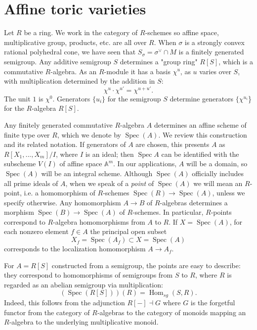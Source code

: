\documentclass[10pt,a4paper]{book}
\newcommand{\on}{\operatorname}
\DeclareMathOperator{\Spec}{Spec}
\begin{document}
\section{Affine toric varieties}
Let $R$ be a ring. We work in the category of $R$-schemes so affine space, multiplicative group, products, etc.  are all over $R$.
When $\sigma$ is a strongly convex rational polyhedral cone, we have seen that $S_\sigma = \sigma^\vee \cap M$ is a finitely generated semigroup. Any additive semigroup $S$ determines a "group ring" $R[S]$, which is a commutative $R$-algebra. As an $R$-module it has a basis $\chi^u$, as $u$ varies over $S$, with multiplication determined by the addition in $S$:
\[
\chi^u\cdot \chi^{u'} = \chi^{u+u'}.
\]
The unit $1$ is $\chi^0$. Generators $\{u_i\}$ for the semigroup $S$ determine generators $\{\chi^{u_i}$\} for the $R$-algebra $R[S]$. 

Any finitely generated commutative $R$-algebra $A$ determines an affine scheme of finite type over $R$, which we denote by $\Spec (A)$. We review this construction and its related notation. If generators of $A$ are chosen, this presents $A$ as $R[X_1,...,X_m]/I$, where $I$ is an ideal;
then $\Spec A$ can be identified with the subscheme $V(I)$ of affine space $\mathbb{A}^m$. In our applications, $A$ will be a domain, so $\Spec(A)$ will be an integral scheme. Although $\Spec(A)$ officially includes all prime ideals of $A$, when we speak of a \textit{point} of $\Spec(A)$ we will mean an $R$-point, i.e. a homomorphism of $R$-schemes $\Spec(R) \to \Spec(A)$, unless we specify otherwise. Any homomorphism $A \to B$ of $R$-algebras determines a morphism $\Spec(B)\to \Spec(A)$ of
$R$-schemes. In particular, $R$-points correspond to $R$-algebra homomorphisms from $A$ to $R$. If $X = \Spec(A)$, for each nonzero element $f \in A$ the principal open subset
\[
X_f = \Spec(A_f) \subset X = \Spec(A)
\]
corresponds to the localization homomorphism $A\to A_f$. 

For $A = R[S]$ constructed from a semigroup, the points are easy to describe: they correspond to homomorphisms of semigroups from $S$ to $R$, where $R$ is regarded as an abelian semigroup via
multiplication:
\[
(\Spec(R[S]))(R) = \on{Hom}_{sg}(S, R).
\]
Indeed, this follows from the adjunction $R[-] \dashv G$ where $G$ is the forgetful functor from the category of $R$-algebras to the category of monoids mapping an $R$-algebra to the underlying multiplicative monoid.
\end{document}
